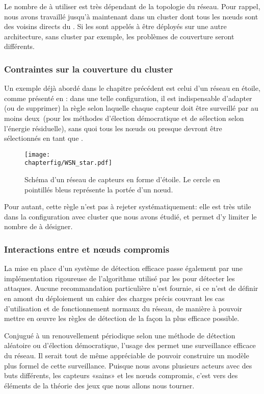 Le nombre de \cns à utiliser est très dépendant de la topologie du réseau.
Pour rappel, nous avons travaillé jusqu'à maintenant dans un cluster dont tous les nœuds sont des voisins directs du \ch.
Si les \cns sont appelés à être déployés sur une autre architecture, sans cluster par exemple, les problèmes de couverture seront différents.

        \subsubsection{Contraintes sur la couverture du cluster}
Un exemple déjà abordé dans le chapitre précédent est celui d'un réseau en étoile, comme présenté en : dans une telle configuration, il est indispensable d'adapter (ou de supprimer) la règle selon laquelle chaque capteur doit être surveillé par au moins deux~\cns (pour les méthodes d'élection démocratique et de sélection selon l'énergie résiduelle), sans quoi tous les nœuds ou presque devront être sélectionnés en tant que \cns.
\begin{figure}[!ht]
    \centering
    \texttt{[image: \\chapterfig/WSN\_star.pdf]}
    \caption[Schéma d'un réseau de capteurs en forme d'étoile]{Schéma d'un réseau de capteurs en forme d'étoile. Le cercle en pointillés bleus représente la portée d'un nœud.}\label{sd:fig:star}
\end{figure}
Pour autant, cette règle n'est pas à rejeter systématiquement: elle est très utile dans la configuration avec cluster que nous avons étudié, et permet d'y limiter le nombre de \cns à désigner.

        \subsubsection{Interactions entre \cns et nœuds compromis}
La mise en place d'un système de détection efficace passe également par une implémentation rigoureuse de l'algorithme utilisé par les \cns pour détecter les attaques.
Aucune recommandation particulière n'est fournie, si ce n'est de définir en amont du déploiement un cahier des charges précis couvrant les cas d'utilisation et de fonctionnement normaux du réseau, de manière à pouvoir mettre en œuvre les règles de détection de la façon la plus efficace possible.

Conjugué à un renouvellement périodique selon une méthode de détection aléatoire ou d'élection démocratique, l'usage des \cns permet une surveillance efficace du réseau.
Il serait tout de même appréciable de pouvoir construire un modèle plus formel de cette surveillance.
Puisque nous avons plusieurs acteurs avec des buts différents, les capteurs «sains» et les nœuds compromis, c'est vers des éléments de la théorie des jeux que nous allons nous tourner.
